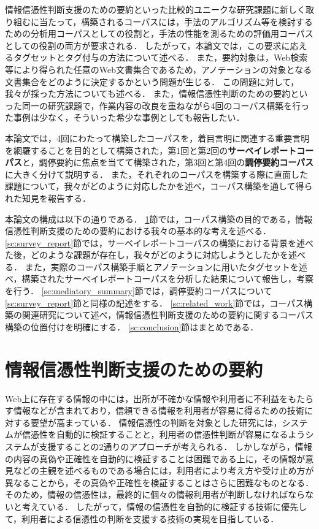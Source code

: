 \documentclass[japanese]{jnlp_1.4}
\begin{document}
情報信憑性判断支援のための要約といった比較的ユニークな研究課題に新しく取り組むに当たって，構築されるコーパスには，手法のアルゴリズム等を検討するための分析用コーパスとしての役割と，手法の性能を測るための評価用コーパスとしての役割の両方が要求される．
したがって，本論文では，この要求に応えるタグセットとタグ付与の方法について述べる．
また，要約対象は，Web検索等により得られた任意のWeb文書集合であるため，アノテーションの対象となる文書集合をどのように決定するかという問題が生じる．
この問題に対して，我々が採った方法についても述べる．
また，情報信憑性判断のための要約といった同一の研究課題で，作業内容の改良を重ねながら4回のコーパス構築を行った事例は少なく，そういった希少な事例としても報告したい．

本論文では，4回にわたって構築したコーパスを，着目言明に関連する重要言明を網羅することを目的として構築された，第1回と第2回の{\bf サーベイレポートコーパス}と，調停要約に焦点を当てて構築された，第3回と第4回の{\bf 調停要約コーパス}に大きく分けて説明する．
また，それぞれのコーパスを構築する際に直面した課題について，我々がどのように対応したかを述べ，コーパス構築を通して得られた知見を報告する．

本論文の構成は以下の通りである．
\ref{sc:summary4ic}節では，コーパス構築の目的である，情報信憑性判断支援のための要約における我々の基本的な考えを述べる．
\ref{sc:survey_report}節では，サーベイレポートコーパスの構築における背景を述べた後，どのような課題が存在し，我々がどのように対応しようとしたかを述べる．
また，実際のコーパス構築手順とアノテーションに用いたタグセットを述べ，構築されたサーベイレポートコーパスを分析した結果について報告し，考察を行う．
\ref{sc:mediatory_summary}節では，調停要約コーパスについて\ref{sc:survey_report}節と同様の記述をする．
\ref{sc:related_work}節では，コーパス構築の関連研究について述べ，情報信憑性判断支援のための要約に関するコーパス構築の位置付けを明確にする．
\ref{sc:conclusion}節はまとめである．


\section{情報信憑性判断支援のための要約}
\label{sc:summary4ic}


Web上に存在する情報の中には，出所が不確かな情報や利用者に不利益をもたらす情報などが含まれており，信頼できる情報を利用者が容易に得るための技術に対する要望が高まっている．
{情報}信憑性の判断を対象とした研究には，システムが信憑性を自動的に検証することと，利用者の信憑性判断が容易になるようシステムが支援することの2通りのアプローチが考えられる．
しかしながら，情報の内容の真偽や正確性を自動的に検証することは困難である上に，その情報が意見などの主観を述べるものである場合には，利用者により考え方や受け止め方が異なることから，その真偽や正確性を検証することはさらに困難なものとなる．
そのため，情報の信憑性は，最終的に個々の情報利用者が判断しなければなら{ない}と考えている．
したがって，情報の信憑性を自動的に検証する技術に優先して，利用者による信憑性の判断を支援する技術の実現を目指している．
\end{document}
